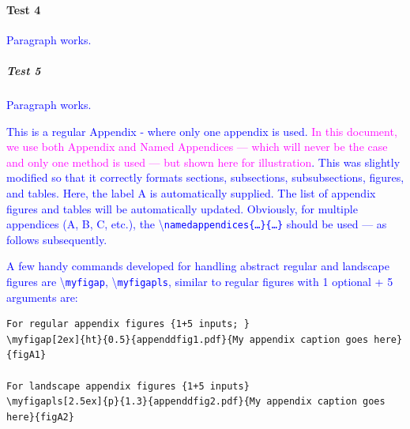 \documentclass[phd,showframe]{ndsu-thesis-2022}
\newcommand\italk[1]{\textcolor{blue}{#1}}  %
\newcommand\cmd[1]{\textbackslash\texttt{#1}}  %
\begin{document}
\paragraph{Test 4}
\italk{Paragraph works.} 

\subparagraph{Test 5}
\italk{Paragraph works.} 


\renewcommand{\bibname}{REFERENCES}

\makerefs %

\label{biblio}


\appendix %

\italk{This is a regular Appendix - where only one appendix is used. \textcolor{magenta}{In this document, we use both Appendix and Named Appendices --- which will never be the case and only one method is used --- but shown here for illustration}. This was slightly modified so that it correctly formats sections, subsections, subsubsections, figures, and tables. Here, the label A is automatically supplied. The list of appendix figures and tables will be automatically updated. Obviously, for multiple appendices (A, B, C, etc.), the \cmd{namedappendices\{\ldots\}\{\ldots\}} should be used --- as follows subsequently.}

\italk{A few handy commands developed for handling abstract regular and landscape figures are \cmd{myfigap}, \cmd{myfigapls}, similar to regular figures with 1 optional + 5 arguments are: } 

\label{figv}
\vspace{2ex}
{\singlespacing
\begin{verbatim}
For regular appendix figures {1+5 inputs; }
\myfigap[2ex]{ht}{0.5}{appenddfig1.pdf}{My appendix caption goes here}{figA1}

For landscape appendix figures {1+5 inputs}
\myfigapls[2.5ex]{p}{1.3}{appenddfig2.pdf}{My appendix caption goes here}{figA2}
\end{verbatim}
}
\end{document}
